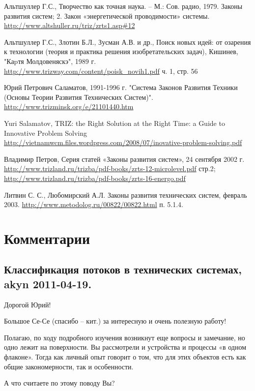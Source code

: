 \documentclass[a4paper,11pt]{article}
\begin{document}
\begin{thebibliography}{xxx}
 Альтшуллер Г.С., Творчество как точная наука. -- М.: Сов. радио,
  1979.  Законы развития систем; 2.  Закон «энергетической проводимости»
  системы. \url{http://www.altshuller.ru/triz/zrts1.asp#12}

 Альтшуллер Г.С., Злотин Б.Л., Зусман А.В. и др., Поиск новых идей:
  от озарения к технологии (теория и практика решения изобретательских задач),
  Кишинев, "Каpтя Молдовеняскэ", 1989 г.
  \url{http://www.trizway.com/content/poisk_novih1.pdf} ч. 1, стр. 56

 Юрий Петрович Саламатов, 1991-1996 г. "Система Законов Развития
  Техники (Основы Теории Развития Технических Систем)".
  \url{http://www.trizminsk.org/e/21101440.htm}

  Yuri Salamatov, TRIZ: the Right Solution at the Right Time: a Guide to
  Innovative Problem Solving
  \url{http://vietnamwcm.files.wordpress.com/2008/07/inovative-problem-solving.pdf}

 Владимир Петров, Серия статей «Законы развития систем», 24
  сентября 2002 г.
  \url{http://www.trizland.ru/trizba/pdf-books/zrts-12-microlevel.pdf} стр.2;
  \url{http://www.trizland.ru/trizba/pdf-books/zrts-16-energo.pdf}

 Литвин С. С., Любомирский А.Л. Законы развития технических систем,
  февраль 2003.  \url{http://www.metodolog.ru/00822/00822.html} п. 5.1.4.
\end{thebibliography}

\section{Комментарии}

\subsection*{Классификация потоков в технических системах, akyn 2011-04-19.}

Дорогой Юрий!

Большое Се-Се (спасибо – кит.) за интересную и очень полезную работу!

Полагаю, по ходу подробного изучения возникнут еще вопросы и замечание, но
одно лежит на поверхности. Вы рассмотрели и устройства и процессы «в одном
флаконе». Тогда как личный опыт говорит о том, что для этих объектов есть как
общие закономерности, так и особенности.

А что считаете по этому поводу Вы?
\end{document}
